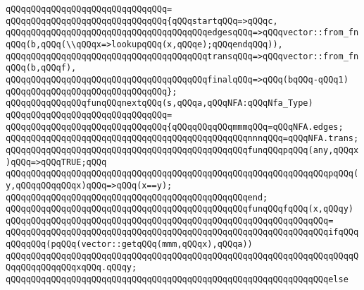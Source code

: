 \verb|qQQqqQQqqQQqqQQqqQQqqQQqqQQqqQQq=|\newline
\verb|qQQqqQQqqQQqqQQqqQQqqQQqqQQqqQQq{qQQqstartqQQq=>qQQqc,|\newline
\verb|qQQqqQQqqQQqqQQqqQQqqQQqqQQqqQQqqQQqqQQqedgesqQQq=>qQQqvector::from_fnqQQq(b,qQQq(\\qQQqx=>lookupqQQq(x,qQQqe);qQQqendqQQq)),|\newline
\verb|qQQqqQQqqQQqqQQqqQQqqQQqqQQqqQQqqQQqqQQqtransqQQq=>qQQqvector::from_fnqQQq(b,qQQqf),|\newline
\verb|qQQqqQQqqQQqqQQqqQQqqQQqqQQqqQQqqQQqqQQqfinalqQQq=>qQQq(bqQQq-qQQq1)|\newline
\verb|qQQqqQQqqQQqqQQqqQQqqQQqqQQqqQQq};|\newline
\newline
\newline
\verb|qQQqqQQqqQQqqQQqfunqQQqnextqQQq(s,qQQqa,qQQqNFA:qQQqNfa_Type)|\newline
\verb|qQQqqQQqqQQqqQQqqQQqqQQqqQQqqQQq=|\newline
\verb|qQQqqQQqqQQqqQQqqQQqqQQqqQQqqQQq{qQQqqQQqqQQqmmmqQQq=qQQqNFA.edges;|\newline
\verb|qQQqqQQqqQQqqQQqqQQqqQQqqQQqqQQqqQQqqQQqqQQqqQQqnnnqQQq=qQQqNFA.trans;|\newline
\newline
\verb|qQQqqQQqqQQqqQQqqQQqqQQqqQQqqQQqqQQqqQQqqQQqqQQqfunqQQqpqQQq(any,qQQqx)qQQq=>qQQqTRUE;qQQq|\newline
\verb|qQQqqQQqqQQqqQQqqQQqqQQqqQQqqQQqqQQqqQQqqQQqqQQqqQQqqQQqqQQqqQQqpqQQq(y,qQQqqQQqqQQqx)qQQq=>qQQq(x==y);|\newline
\verb|qQQqqQQqqQQqqQQqqQQqqQQqqQQqqQQqqQQqqQQqqQQqqQQqend;|\newline
\newline
\newline
\verb|qQQqqQQqqQQqqQQqqQQqqQQqqQQqqQQqqQQqqQQqqQQqqQQqfunqQQqfqQQq(x,qQQqy)|\newline
\verb|qQQqqQQqqQQqqQQqqQQqqQQqqQQqqQQqqQQqqQQqqQQqqQQqqQQqqQQqqQQqqQQq=|\newline
\verb|qQQqqQQqqQQqqQQqqQQqqQQqqQQqqQQqqQQqqQQqqQQqqQQqqQQqqQQqqQQqqQQqifqQQqqQQqqQQq(pqQQq(vector::getqQQq(mmm,qQQqx),qQQqa))|\newline
\newline
\verb|qQQqqQQqqQQqqQQqqQQqqQQqqQQqqQQqqQQqqQQqqQQqqQQqqQQqqQQqqQQqqQQqqQQqqQQqqQQqqQQqqQQqxqQQq.qQQqy;|\newline
\verb|qQQqqQQqqQQqqQQqqQQqqQQqqQQqqQQqqQQqqQQqqQQqqQQqqQQqqQQqqQQqqQQqelse|\newline
